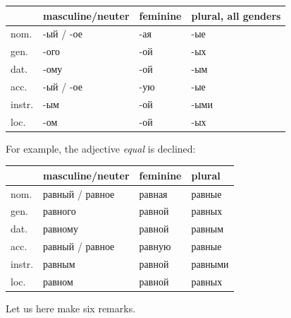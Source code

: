 \begin{center}
\small
\begin{tabular}{@{}l >{\cyrillicfont}l >{\cyrillicfont}l >{\cyrillicfont}l@{}}
\toprule
& masculine/neuter & feminine & plural, all genders\\
\midrule
nom. & -ый / -ое & -ая & -ые\\
gen. & -ого & -ой & -ых\\
dat. & -ому & -ой & -ым\\
acc. & -ый / -ое & -ую & -ые\\
instr. & -ым & -ой & -ыми\\
loc. & -ом & -ой & -ых\\
\bottomrule
\end{tabular}
\end{center}

For example, the adjective  \emph{equal} is declined:

\begin{center}
\small
\begin{tabular}{@{}l >{\cyrillicfont}l >{\cyrillicfont}l >{\cyrillicfont}l@{}}
\toprule
& masculine/neuter & feminine & plural\\
\midrule
nom. & равный / равное & равная & равные\\
gen. & равного & равной & равных\\
dat. & равному & равной & равным\\
acc. & равный / равное & равную & равные\\
instr. & равным & равной & равными\\
loc. & равном & равной & равных\\
\bottomrule
\end{tabular}
\end{center}

Let us here make six remarks.

